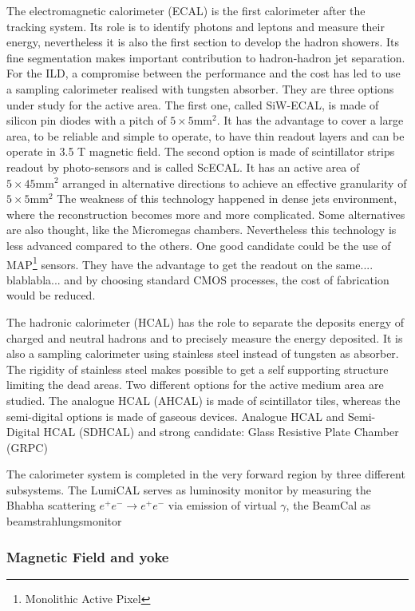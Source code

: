      The electromagnetic calorimeter (ECAL) is the first calorimeter after the tracking system.
      Its role is to identify photons and leptons and measure their energy, nevertheless it is also the first section to develop the hadron showers.
      Its fine segmentation makes important contribution to hadron-hadron jet separation.
      For the \gls{ILD}, a compromise between the performance and the cost has led to use a sampling calorimeter realised with tungsten absorber.
      They are three options under study for the active area.
      The first one, called SiW-ECAL, is made of silicon pin diodes with a pitch of $5 \times 5 \text{mm}^2$. 
      It has the advantage to cover a large area, to be reliable and simple to operate, to have thin readout layers and can be operate in 3.5 T magnetic field.
      The second option is made of scintillator strips readout by photo-sensors and is called ScECAL.
      It has an active area of $5 \times 45 \text{mm}^2$ arranged in alternative directions to achieve an effective granularity of $5 \times 5 \text{mm}^2$ 
      The weakness of this technology happened in dense jets environment, where the reconstruction becomes more and more complicated.
      Some alternatives are also thought, like the Micromegas chambers. Nevertheless this technology is less advanced compared to the others.
      One good candidate could be the use of MAP\footnote{Monolithic Active Pixel} sensors.
      They have the advantage to get the readout on the same.... blablabla...
      and by choosing standard CMOS processes, the cost of fabrication would be reduced.

      The hadronic calorimeter (HCAL) has the role to separate the deposits energy of charged and neutral hadrons and to precisely measure the energy deposited.
      It is also a sampling calorimeter using stainless steel instead of tungsten as absorber. 
      The rigidity of stainless steel makes possible to get a self supporting structure limiting the dead areas.
      Two different options for the active medium area are studied.
      The analogue HCAL (AHCAL) is made of scintillator tiles, whereas the semi-digital options is made of gaseous devices.
      Analogue HCAL and Semi-Digital HCAL (SDHCAL)  and strong candidate: Glass Resistive Plate Chamber (GRPC)

      The calorimeter system is completed in the very forward region by three different subsystems. 
      The LumiCAL serves as luminosity monitor by measuring the Bhabha scattering $e^+e^- \rightarrow e^+e^-$ via emission of virtual $\gamma$, the BeamCal as beamstrahlungsmonitor 

      

      \subsubsection{Magnetic Field and yoke}
